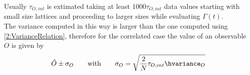 Usually $\tau_{O,int}$ is extimated taking at least $1000\tau_{O,int}$ data values starting with small size lattices and proceeding to larger sizes while evaluating $\Gamma(t)$.\\
The variance computed in this way is larger than the one computed using \eqref{2:VarianceRelation}, therefore for the correlated case the value of an observable $O$ is given by
\begin{equation}
    \hat{O}\pm\sigma_O \qquad\text{with}\qquad \sigma_O = \sqrt{\frac2N\tau_{O,int}\hvariance_O} \label{2:FinalMeasureCorr}
\end{equation}
